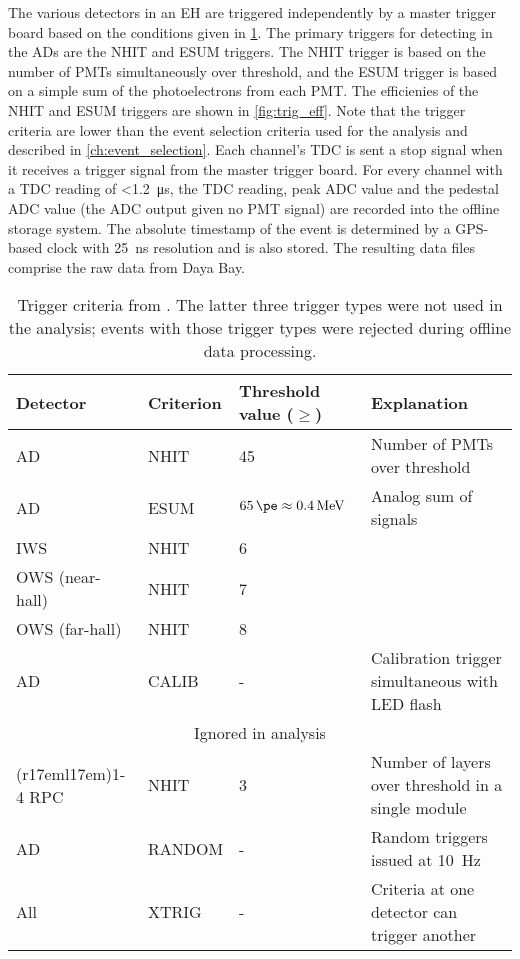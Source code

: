 The various detectors in an EH are triggered independently
by a master trigger board based on the conditions given in \cref{tab:trigger}.
The primary triggers for detecting \nuebar{} in the ADs are the NHIT and ESUM triggers.
The NHIT trigger is based on the number of PMTs simultaneously over threshold,
and the ESUM trigger is based on a simple sum of the photoelectrons
from each PMT.
The efficienies of the NHIT and ESUM triggers are shown in \cref{fig:trig_eff}.
Note that the trigger criteria are lower than the event selection
criteria used for the \thetaot{} analysis and described in \cref{ch:event_selection}.
Each channel's TDC is sent a stop signal when it receives a trigger signal
from the master trigger board.
For every channel with a TDC reading of \SI{<1.2}{\us},
the TDC reading, peak ADC value and the pedestal ADC value
(the ADC output given no PMT signal)
are recorded into the offline storage system.
The absolute timestamp of the event is determined by a GPS-based clock
with \SI{25}{\ns} resolution and is also stored.
The resulting data files comprise the raw data from Daya Bay.


\begin{table}[ht]
    \centering
    \begin{tabular}[t]{lllp{6cm}}
        \toprule
        Detector & Criterion & Threshold value ($\geq$) & Explanation\\
        \midrule
        AD & NHIT & \num{45} & Number of PMTs over threshold \\
        AD & ESUM & $\SI{65}{\pe}\approx \SI{0.4}{\MeV}$ & Analog sum of signals \\
        IWS & NHIT & \num{6} & \\
        OWS (near-hall) & NHIT & \num{7} & \\
        OWS (far-hall) & NHIT & \num{8} & \\
        AD & CALIB & - & Calibration trigger simultaneous with LED flash \\
        \midrule
        \multicolumn{4}{c}{Ignored in \thetaot{} analysis} \\
        \cmidrule(r{17em}l{17em}){1-4}
        RPC & NHIT & \num{3} & Number of layers over threshold in a single module \\
        AD & RANDOM & - & Random triggers issued at \SI{10}{\Hz} \\
        All & XTRIG & - & Criteria at one detector can trigger another \\
        \bottomrule
    \end{tabular}
    \caption[Trigger criteria]{
        Trigger criteria from \cite{ngd2016}.
        The latter three trigger types were not used in the \thetaot{} analysis;
        events with those trigger types were rejected
        during offline data processing.
    }
    \label{tab:trigger}
\end{table}

